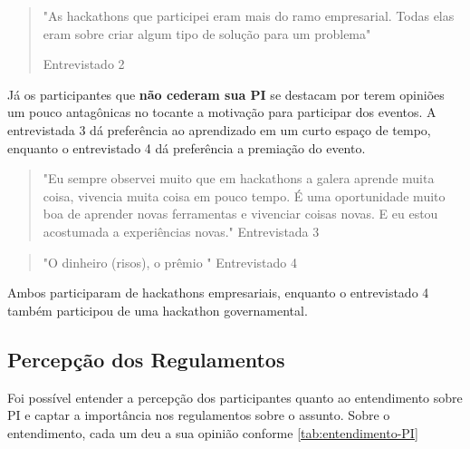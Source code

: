 \begin{quote}
    "As hackathons que participei eram mais do ramo empresarial. Todas elas eram sobre criar algum tipo de solução para um problema"
    
    \flushright Entrevistado 2
\end{quote}

Já os participantes que \textbf{não cederam sua PI} se destacam por terem opiniões um pouco antagônicas no tocante a motivação para participar dos eventos. A entrevistada 3 dá preferência ao aprendizado em um curto espaço de tempo, enquanto o entrevistado 4 dá preferência a premiação do evento.

\begin{quote}
    "Eu sempre observei muito que em hackathons a galera aprende muita coisa, vivencia muita coisa em pouco tempo. É uma oportunidade muito boa de aprender novas ferramentas e vivenciar coisas novas. E eu estou acostumada a experiências novas."
    \flushright Entrevistada 3
\end{quote}

\begin{quote}
    "O dinheiro (risos), o prêmio "
    \flushright Entrevistado 4
\end{quote}

Ambos participaram de hackathons empresariais, enquanto o entrevistado 4 também participou de uma hackathon governamental.

\subsection{Percepção dos Regulamentos}

Foi possível entender a percepção dos participantes quanto ao entendimento sobre PI e captar a importância nos regulamentos sobre o assunto. Sobre o entendimento, cada um deu a sua opinião conforme \autoref{tab:entendimento-PI}


